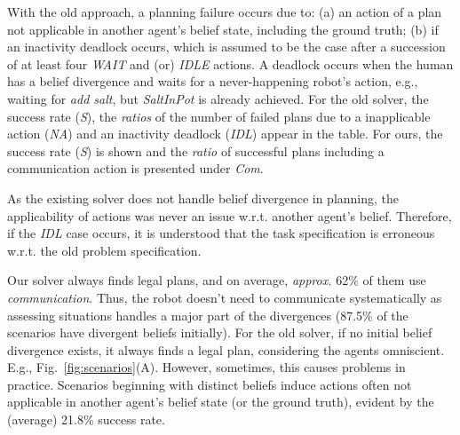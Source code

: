 \documentclass[letterpaper]{article} %
\begin{document}
With the old approach, a planning failure occurs due to: 
(a) an action of a plan not applicable in another agent's belief state, including the ground truth; 
(b) if an inactivity deadlock occurs, which is assumed to be the case after a succession of at least four \textit{WAIT} and (or) \textit{IDLE} actions. 
A deadlock occurs when the human has a belief divergence and waits for a never-happening robot's action, e.g., waiting for \textit{add salt}, but \textit{SaltInPot} is already achieved.
For the old solver, the success rate (\textit{S}), the \textit{ratios} of the number of failed plans due to a inapplicable action (\textit{NA}) and an inactivity deadlock (\textit{IDL}) appear in the table.
For ours, the success rate (\textit{S}) is shown and the \textit{ratio} of successful plans including a communication action is presented under \textit{Com}.

As the existing solver does not handle belief divergence in planning, the applicability of actions was never an issue w.r.t. another agent's belief. Therefore, if the \textit{IDL} case occurs, it is understood that the task specification is erroneous w.r.t. the old problem specification. 

Our solver always finds legal plans, and on average, \textit{approx.} 62\% of them use \textit{communication}.
Thus, the robot doesn't need to communicate systematically as assessing situations handles a major part of the divergences (87.5\% of the scenarios have divergent beliefs initially).
For the old solver, if no initial belief divergence exists, it always finds a legal plan, considering the agents omniscient. 
E.g., Fig.~\ref{fig:scenarios}(A). However, sometimes, this causes problems in practice.
Scenarios beginning with distinct beliefs induce actions often not applicable in another agent's belief state (or the ground truth), evident by the (average) 21.8\% success rate.
\end{document}
